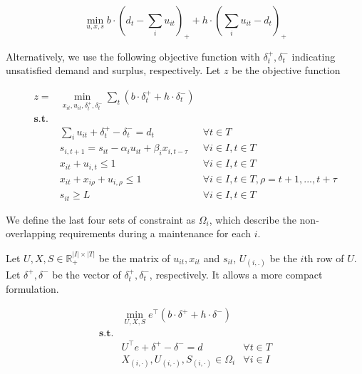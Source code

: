 \documentclass[
  a4paper,
,tablecaptionabove
]{scrartcl}
\numberwithin{equation}{section}
\begin{document}
\[\min_{u,x,s} b \cdot (d_t - \sum_i u_{it})_+ + h \cdot  ( \sum_i u_{it} - d_t)_+ \]

Alternatively, we use the following objective function with
\(\delta^+_t, \delta^-_t\) indicating unsatisfied demand and surplus,
respectively. Let \(z\) be the objective function

\[\begin{aligned}
    z =           & \min_{x_{it}, u_{it}, \delta_t^+, \delta_t^-} \sum_t (b\cdot  \delta_t^+ + h \cdot \delta_t^-)                                                       \\
    \mathbf{s.t.} &                                                                                                                                                      \\
                  & \sum_i u_{it} + \delta_t^+ - \delta_t^- = d_t                                                  & \forall t \in T                                     \\
                  & s_{i, t+1} =  s_{i t}  - \alpha_i  u_{it} + \beta_i  x_{i, t- \tau}                            & \forall i \in I, t \in T                            \\
                  & x_{it} +  u_{i, t} \le 1                                                                       & \forall i \in I, t \in T                            \\
                  & x_{it} + x_{i\rho} + u_{i, \rho} \le 1                                                         & \forall i \in I,  t\in T, \rho = t + 1, ..., t+\tau \\
                  & s_{i t} \ge L                                                                                  & \forall i \in I, t \in T
  \end{aligned}\]

We define the last four sets of constraint as \(\Omega_i\), which
describe the non-overlapping requirements during a maintenance for each
\(i\).

Let \(U, X, S \in \mathbb R^{|I|\times |T|}_+\) be the matrix of
\(u_{it}, x_{it}\) and \(s_{it}\), \(U_{(i,.)}\) be the \(i\)th row of
\(U\). Let \(\delta^+, \delta^-\) be the vector of
\(\delta_t^+, \delta_t^-\), respectively. It allows a more compact
formulation.

\[\begin{aligned}
                  & \min_{U, X, S}  e^\top (b\cdot  \delta^+ + h \cdot \delta^-)                   \\
    \mathbf{s.t.} &                                                                                \\
                  & U^\top e + \delta^+ - \delta^- = d                           & \forall t \in T \\
                  & X_{(i,\cdot)}, U_{(i,\cdot)}, S_{(i,\cdot)} \in \Omega_i     & \forall i \in I
  \end{aligned}\]
\end{document}

